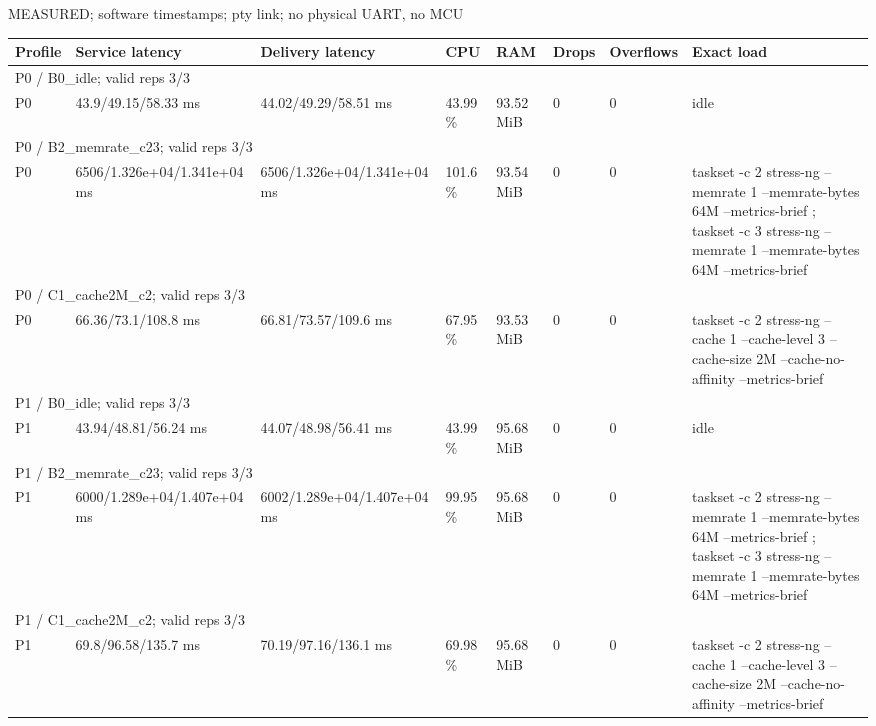 \par\noindent MEASURED; software timestamps; pty link; no physical UART, no MCU\par
\begin{tabular}{llllllll}
\toprule
Profile & Service latency & Delivery latency & CPU & RAM & Drops & Overflows & Exact load \\
\midrule
\multicolumn{8}{l}{P0 / B0\_idle; valid reps 3/3} \\
P0 & 43.9/49.15/58.33 ms & 44.02/49.29/58.51 ms & 43.99 \% & 93.52 MiB & 0 & 0 & idle \\
\multicolumn{8}{l}{P0 / B2\_memrate\_c23; valid reps 3/3} \\
P0 & 6506/1.326e+04/1.341e+04 ms & 6506/1.326e+04/1.341e+04 ms & 101.6 \% & 93.54 MiB & 0 & 0 & taskset -c 2 stress-ng --memrate 1 --memrate-bytes 64M --metrics-brief ; taskset -c 3 stress-ng --memrate 1 --memrate-bytes 64M --metrics-brief \\
\multicolumn{8}{l}{P0 / C1\_cache2M\_c2; valid reps 3/3} \\
P0 & 66.36/73.1/108.8 ms & 66.81/73.57/109.6 ms & 67.95 \% & 93.53 MiB & 0 & 0 & taskset -c 2 stress-ng --cache 1 --cache-level 3 --cache-size 2M --cache-no-affinity --metrics-brief \\
\multicolumn{8}{l}{P1 / B0\_idle; valid reps 3/3} \\
P1 & 43.94/48.81/56.24 ms & 44.07/48.98/56.41 ms & 43.99 \% & 95.68 MiB & 0 & 0 & idle \\
\multicolumn{8}{l}{P1 / B2\_memrate\_c23; valid reps 3/3} \\
P1 & 6000/1.289e+04/1.407e+04 ms & 6002/1.289e+04/1.407e+04 ms & 99.95 \% & 95.68 MiB & 0 & 0 & taskset -c 2 stress-ng --memrate 1 --memrate-bytes 64M --metrics-brief ; taskset -c 3 stress-ng --memrate 1 --memrate-bytes 64M --metrics-brief \\
\multicolumn{8}{l}{P1 / C1\_cache2M\_c2; valid reps 3/3} \\
P1 & 69.8/96.58/135.7 ms & 70.19/97.16/136.1 ms & 69.98 \% & 95.68 MiB & 0 & 0 & taskset -c 2 stress-ng --cache 1 --cache-level 3 --cache-size 2M --cache-no-affinity --metrics-brief \\
\bottomrule
\end{tabular}
